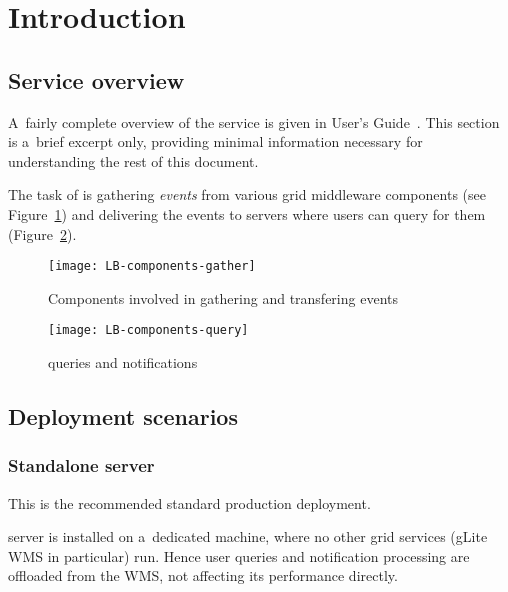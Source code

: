 \section{Introduction}

\subsection{Service overview}

A~fairly complete overview of the \LB service is given in \LB User's Guide~\cite{lbug}.
This section is a~brief excerpt only, providing minimal information necessary for
understanding the rest of this document.

The task of \LB is gathering \emph{\LB events} from various grid middleware components
(see Figure~\ref{f:comp-gather})
and delivering the events to \LB servers where users can query for them
(Figure~\ref{f:comp-query}).

\begin{figure}[ht]
\centering
\texttt{[image: LB-components-gather]}
\caption{Components involved in gathering and transfering \LB events}
\label{f:comp-gather}
\end{figure}

\begin{figure}[ht]
\centering
\texttt{[image: LB-components-query]}
\caption{\LB queries and notifications}
\label{f:comp-query}
\end{figure}




\subsection{Deployment scenarios}



\subsubsection{Standalone \LB server}
\label{deploy-stand}

This is the recommended standard production deployment.

\LB server is installed on a~dedicated machine,
where no other grid services (gLite WMS in particular) run.
Hence user queries and notification processing are offloaded 
from the WMS, not affecting its performance directly.


